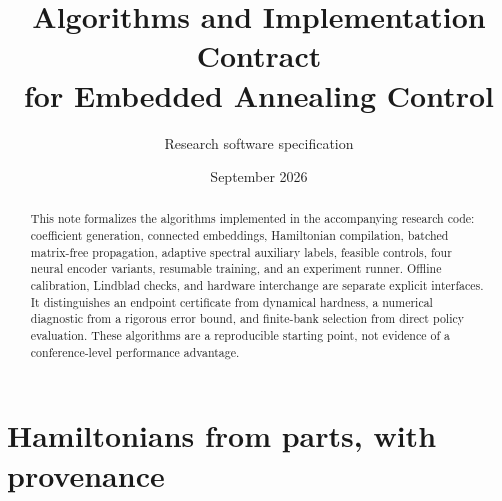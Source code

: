 \documentclass[10pt]{article}
\title{Algorithms and Implementation Contract\\for Embedded Annealing Control}
\author{Research software specification}
\date{September 2026}
\begin{document}
\maketitle
\vspace{-1.1em}
\begin{abstract}
This note formalizes the algorithms implemented in the accompanying research
code: coefficient generation, connected embeddings, Hamiltonian compilation,
batched matrix-free propagation, adaptive spectral auxiliary labels, feasible
controls, four neural encoder variants, resumable training, and an experiment
runner. Offline calibration, Lindblad checks, and hardware interchange are
separate explicit interfaces. It distinguishes an endpoint certificate from dynamical
hardness, a numerical diagnostic from a rigorous error bound, and finite-bank
selection from direct policy evaluation. These algorithms are a reproducible
starting point, not evidence of a conference-level performance advantage.
\end{abstract}

\section{Hamiltonians from parts, with provenance}
\end{document}
